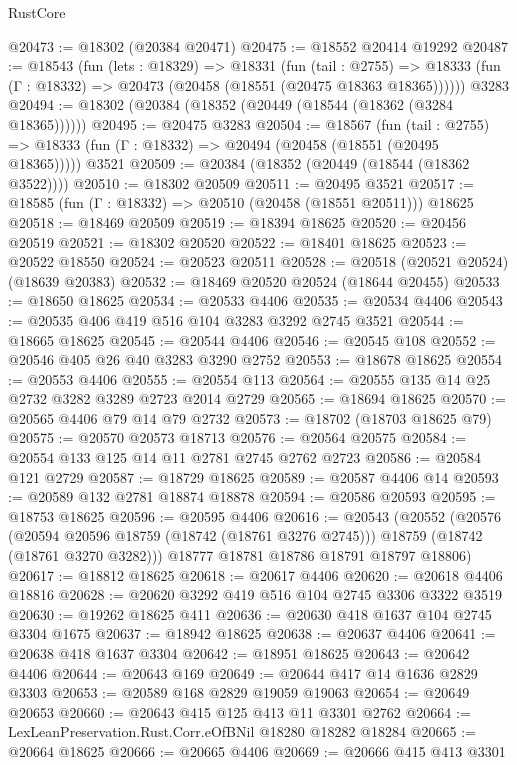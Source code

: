 \begin{lexlean}{RustCore}
\begin{coremodule}
@20473 := @18302 (@20384 @20471)
@20475 := @18552 @20414 @19292
@20487 := @18543
    (fun (lets : @18329) =>
    @18331
      (fun (tail : @2755) =>
      @18333 (fun (Γ : @18332) => @20473 (@20458 (@18551 (@20475 @18363 @18365))))))
    @3283
@20494 := @18302 (@20384 (@18352 (@20449 (@18544 (@18362 (@3284 @18365))))))
@20495 := @20475 @3283
@20504 := @18567
    (fun (tail : @2755) => @18333 (fun (Γ : @18332) => @20494 (@20458 (@18551 (@20495 @18365)))))
    @3521
@20509 := @20384 (@18352 (@20449 (@18544 (@18362 @3522))))
@20510 := @18302 @20509
@20511 := @20495 @3521
@20517 := @18585 (fun (Γ : @18332) => @20510 (@20458 (@18551 @20511))) @18625
@20518 := @18469 @20509
@20519 := @18394 @18625
@20520 := @20456 @20519
@20521 := @18302 @20520
@20522 := @18401 @18625
@20523 := @20522 @18550
@20524 := @20523 @20511
@20528 := @20518 (@20521 @20524) (@18639 @20383)
@20532 := @18469 @20520 @20524 (@18644 @20455)
@20533 := @18650 @18625
@20534 := @20533 @4406
@20535 := @20534 @4406
@20543 := @20535 @406 @419 @516 @104 @3283 @3292 @2745 @3521
@20544 := @18665 @18625
@20545 := @20544 @4406
@20546 := @20545 @108
@20552 := @20546 @405 @26 @40 @3283 @3290 @2752
@20553 := @18678 @18625
@20554 := @20553 @4406
@20555 := @20554 @113
@20564 := @20555 @135 @14 @25 @2732 @3282 @3289 @2723 @2014 @2729
@20565 := @18694 @18625
@20570 := @20565 @4406 @79 @14 @79 @2732
@20573 := @18702 (@18703 @18625 @79)
@20575 := @20570 @20573 @18713
@20576 := @20564 @20575
@20584 := @20554 @133 @125 @14 @11 @2781 @2745 @2762 @2723
@20586 := @20584 @121 @2729
@20587 := @18729 @18625
@20589 := @20587 @4406 @14
@20593 := @20589 @132 @2781 @18874 @18878
@20594 := @20586 @20593
@20595 := @18753 @18625
@20596 := @20595 @4406
@20616 := @20543
    (@20552
      (@20576
        (@20594 @20596 @18759 (@18742 (@18761 @3276 @2745)))
        @18759
        (@18742 (@18761 @3270 @3282)))
      @18777
      @18781
      @18786
      @18791
      @18797
      @18806)
@20617 := @18812 @18625
@20618 := @20617 @4406
@20620 := @20618 @4406 @18816
@20628 := @20620 @3292 @419 @516 @104 @2745 @3306 @3322 @3519
@20630 := @19262 @18625 @411
@20636 := @20630 @418 @1637 @104 @2745 @3304 @1675
@20637 := @18942 @18625
@20638 := @20637 @4406
@20641 := @20638 @418 @1637 @3304
@20642 := @18951 @18625
@20643 := @20642 @4406
@20644 := @20643 @169
@20649 := @20644 @417 @14 @1636 @2829 @3303
@20653 := @20589 @168 @2829 @19059 @19063
@20654 := @20649 @20653
@20660 := @20643 @415 @125 @413 @11 @3301 @2762
@20664 := LexLeanPreservation.Rust.Corr.eOfBNil @18280 @18282 @18284
@20665 := @20664 @18625
@20666 := @20665 @4406
@20669 := @20666 @415 @413 @3301

\end{coremodule}
\end{lexlean}
